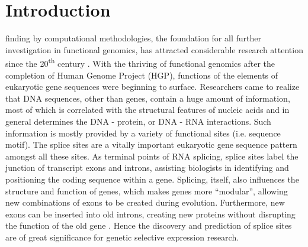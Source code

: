 \documentclass[journal,twoside]{IEEEtran}
\begin{document}
\section{Introduction}\label{1}
 finding by computational methodologies, the foundation for all further investigation in functional genomics, has attracted considerable research attention since the 20\textsuperscript{th} century \cite{burge1997prediction}. With the thriving of functional genomics after the completion of Human Genome Project (HGP), functions of the elements of eukaryotic gene sequences were beginning to surface. Researchers came to realize that DNA sequences, other than genes, contain a huge amount of information, most of which is correlated with the structural features of nucleic acids and in general determines the DNA - protein, or DNA - RNA interactions. Such information is mostly provided by a variety of functional sites (i.e. sequence motif). The splice sites are a vitally important eukaryotic gene sequence pattern amongst all these sites. As terminal points of RNA splicing, splice sites label the junction of transcript exons and introns, assisting biologists in identifying and positioning the coding sequence within a gene. Splicing, itself, also influences the structure and function of genes, which makes genes more ``modular'', allowing new combinations of exons to be created during evolution. Furthermore, new exons can be inserted into old introns, creating new proteins without disrupting the function of the old gene \cite{clancy2008rna}. Hence the discovery and prediction of splice sites are of great significance for genetic selective expression research. 
\end{document}
